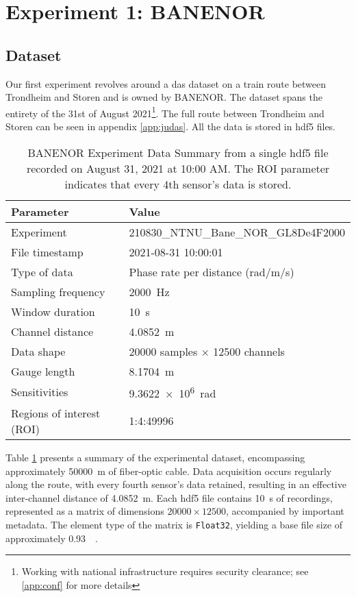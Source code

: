 \section{Experiment 1: BANENOR}

\subsection{Dataset}

Our first experiment revolves around a \acrshort{das} dataset on a train route between Trondheim and Storen and is owned by BANENOR. The dataset spans the entirety of the 31st of August 2021\footnote{Working with national infrastructure requires security clearance; see \ref{app:conf} for more details}. The full route between Trondheim and Storen can be seen in appendix \ref{app:judas}. All the data is stored in \acrshort{hdf5} files.

\begin{table}[!h]
    \centering
    \small
    \begin{tabular}{@{}p{}p{}@{}}
        \toprule
        \textbf{Parameter} & \textbf{Value} \\
        \midrule
        Experiment & 210830\_NTNU\_Bane\_NOR\_GL8De4F2000  \\
        File timestamp & 2021-08-31 10:00:01  \\
        Type of data & Phase rate per distance (rad/m/s) \\
        Sampling frequency & \qty{2000}{\hertz} \\
        Window duration & \qty{10}{\second} \\
        Channel distance & \qty{4.0852}{\meter} \\
        \midrule
        Data shape & 20000 samples \(\times\) 12500 channels  \\
        \midrule
        Gauge length & \qty{8.1704}{\meter} \\
        Sensitivities & \qty{9.3622e6}{\radian} \\
        Regions of interest (ROI) & 1:4:49996 \\
        \bottomrule
    \end{tabular}
    \caption{BANENOR Experiment Data Summary from a single \acrshort{hdf5} file recorded on August 31, 2021 at 10:00 AM. The ROI parameter indicates that every 4th sensor's data is stored.}
    \label{tab:experiment_data}
\end{table}

Table \ref{tab:experiment_data} presents a summary of the experimental dataset, encompassing approximately \qty{50000}{\meter} of fiber-optic cable. Data acquisition occurs regularly along the route, with every fourth sensor's data retained, resulting in an effective inter-channel distance of \qty{4.0852}{\meter}. Each \acrshort{hdf5} file contains \qty{10}{\second} of recordings, represented as a matrix of dimensions $20000 \times 12500$, accompanied by important metadata. The element type of the matrix is \texttt{Float32}, yielding a base file size of approximately \qty{0.93}{\giga\byte}.

